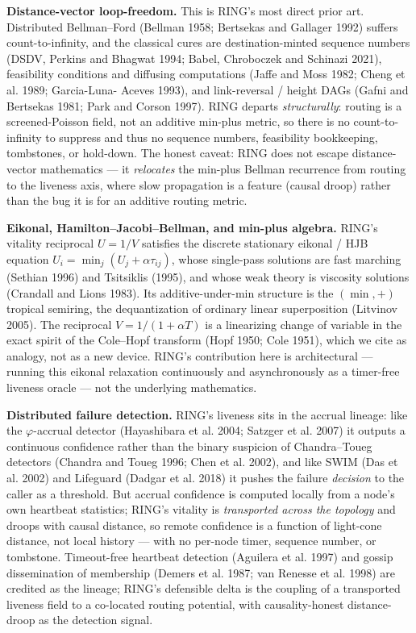 \documentclass[11pt]{article}
\theoremstyle{plain}
\numberwithin{equation}{section}
\begin{document}
\textbf{Distance-vector loop-freedom.} This is RING's most direct prior art. Distributed Bellman–Ford (Bellman 1958; Bertsekas and Gallager 1992) suffers count-to-infinity, and the classical cures are destination-minted sequence numbers (DSDV, Perkins and Bhagwat 1994; Babel, Chroboczek and Schinazi 2021), feasibility conditions and diffusing computations (Jaffe and Moss 1982; Cheng et al. 1989; Garcia-Luna- Aceves 1993), and link-reversal / height DAGs (Gafni and Bertsekas 1981; Park and Corson 1997). RING departs \emph{structurally}: routing is a screened-Poisson field, not an additive min-plus metric, so there is no count-to-infinity to suppress and thus no sequence numbers, feasibility bookkeeping, tombstones, or hold-down. The honest caveat: RING does not escape distance-vector mathematics — it \emph{relocates} the min-plus Bellman recurrence from routing to the liveness axis, where slow propagation is a feature (causal droop) rather than the bug it is for an additive routing metric.

\textbf{Eikonal, Hamilton–Jacobi–Bellman, and min-plus algebra.} RING's vitality reciprocal $U=1/V$ satisfies the discrete stationary eikonal / HJB equation $U_i=\min_j(U_j+\alpha\tau_{ij})$, whose single-pass solutions are fast marching (Sethian 1996) and Tsitsiklis (1995), and whose weak theory is viscosity solutions (Crandall and Lions 1983). Its additive-under-min structure is the $(\min,+)$ tropical semiring, the dequantization of ordinary linear superposition (Litvinov 2005). The reciprocal $V=1/(1+\alpha T)$ is a linearizing change of variable in the exact spirit of the Cole–Hopf transform (Hopf 1950; Cole 1951), which we cite as analogy, not as a new device. RING's contribution here is architectural — running this eikonal relaxation continuously and asynchronously as a timer-free liveness oracle — not the underlying mathematics.

\textbf{Distributed failure detection.} RING's liveness sits in the accrual lineage: like the $\varphi$-accrual detector (Hayashibara et al. 2004; Satzger et al. 2007) it outputs a continuous confidence rather than the binary suspicion of Chandra–Toueg detectors (Chandra and Toueg 1996; Chen et al. 2002), and like SWIM (Das et al. 2002) and Lifeguard (Dadgar et al. 2018) it pushes the failure \emph{decision} to the caller as a threshold. But accrual confidence is computed locally from a node's own heartbeat statistics; RING's vitality is \emph{transported across the topology} and droops with causal distance, so remote confidence is a function of light-cone distance, not local history — with no per-node timer, sequence number, or tombstone. Timeout-free heartbeat detection (Aguilera et al. 1997) and gossip dissemination of membership (Demers et al. 1987; van Renesse et al. 1998) are credited as the lineage; RING's defensible delta is the coupling of a transported liveness field to a co-located routing potential, with causality-honest distance-droop as the detection signal.
\end{document}
